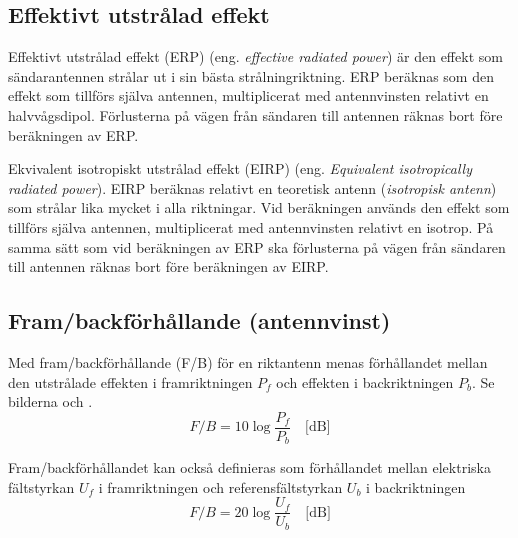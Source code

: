 \subsection{Effektivt utstrålad effekt}

Effektivt utstrålad effekt (ERP) (eng. \emph{effective radiated power}) är den
effekt som sändarantennen strålar ut i sin bästa strålningriktning.
ERP beräknas som den effekt som tillförs själva antennen, multiplicerat med
antennvinsten relativt en halvvågsdipol.
Förlusterna på vägen från sändaren till antennen räknas bort före beräkningen av
ERP.

Ekvivalent isotropiskt utstrålad effekt (EIRP)
(eng. \emph{Equivalent isotropically radiated power}).
EIRP beräknas relativt en teoretisk antenn (\emph{isotropisk antenn}) som
strålar lika mycket i alla riktningar.
Vid beräkningen används den effekt som tillförs själva antennen, multiplicerat
med antennvinsten relativt en isotrop.
På samma sätt som vid beräkningen av ERP ska förlusterna på vägen från sändaren
till antennen räknas bort före beräkningen av EIRP.

\subsection{Fram/backförhållande (antennvinst)}

Med fram/backförhållande (F/B) för en riktantenn menas förhållandet mellan den
utstrålade effekten i framriktningen \(P_f\) och effekten i backriktningen
\(P_b\). Se bilderna  och .
\[ F/B = 10 \log\frac{P_f}{P_b} \quad \text{[dB]} \]

Fram/backförhållandet kan också definieras som förhållandet mellan elektriska
fältstyrkan \(U_f\) i framriktningen och referensfältstyrkan \(U_b\) i
backriktningen
\[ F/B = 20 \log\frac{U_f}{U_b} \quad \text{[dB]} \]

